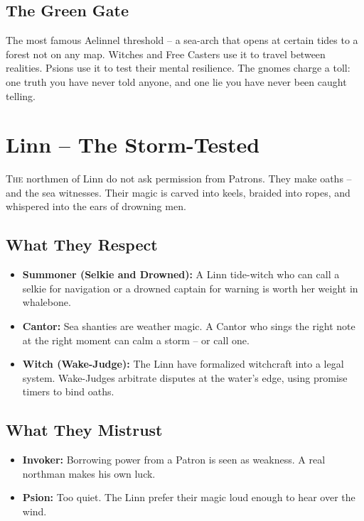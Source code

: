 \documentclass[10pt,a5paper]{book}
\begin{document}
\subsection*{The Green Gate}
The most famous Aelinnel threshold -- a sea-arch that opens at certain tides to a forest not on any map. Witches and Free Casters use it to travel between realities. Psions use it to test their mental resilience. The gnomes charge a toll: one truth you have never told anyone, and one lie you have never been caught telling.

\section{Linn -- The Storm-Tested}

\lettrine{T}{he} northmen of Linn do not ask permission from Patrons. They make oaths -- and the sea witnesses. Their magic is carved into keels, braided into ropes, and whispered into the ears of drowning men.

\subsection*{What They Respect}
\begin{itemize}
    \item \textbf{Summoner (Selkie and Drowned):} A Linn tide-witch who can call a selkie for navigation or a drowned captain for warning is worth her weight in whalebone.
    \item \textbf{Cantor:} Sea shanties are weather magic. A Cantor who sings the right note at the right moment can calm a storm -- or call one.
    \item \textbf{Witch (Wake-Judge):} The Linn have formalized witchcraft into a legal system. Wake-Judges arbitrate disputes at the water's edge, using promise timers to bind oaths.
\end{itemize}

\subsection*{What They Mistrust}
\begin{itemize}
    \item \textbf{Invoker:} Borrowing power from a Patron is seen as weakness. A real northman makes his own luck.
    \item \textbf{Psion:} Too quiet. The Linn prefer their magic loud enough to hear over the wind.
\end{itemize}
\end{document}
